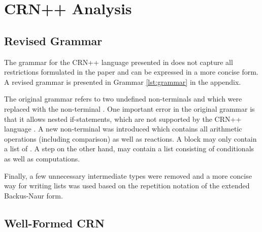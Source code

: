 \section{CRN++ Analysis}

\subsection{Revised Grammar} %
\setlength{\grammarparsep}{4pt plus 1pt minus 1pt} %
\setlength{\grammarindent}{10em} %

The grammar for the CRN++ language presented in \cite{soloveichik2018a} does not capture all restrictions formulated in the paper and can be expressed in a more concise form. A revised grammar is presented in Grammar \ref{lst:grammar} in the appendix.

The original grammar refers to two undefined non-terminals  and  which were replaced with the non-terminal . One important error in the original grammar is that it allows nested if-statements, which are not supported by the CRN++ language \cite{soloveichik2018a}. A new non-terminal  was introduced which contains all arithmetic operations (including comparison) as well as reactions. A  block may only contain a list of . A step on the other hand, may contain a list consisting of conditionals as well as computations.

Finally, a few unnecessary intermediate types were removed and a more concise way for writing lists was used based on the repetition notation of the extended Backus-Naur form.

\subsection{Well-Formed CRN} %
\label{sec:well-formed}

